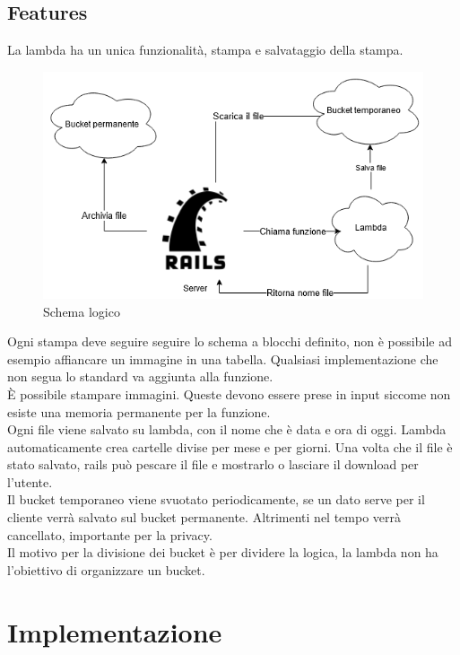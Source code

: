\documentclass[12pt]{article}
\begin{document}
\subsection{Features}
La lambda ha un unica funzionalità, stampa e salvataggio della stampa.
\begin{figure}[H]
\includegraphics[scale = 0.6]{useCases.png}
\caption{Schema logico}
\end{figure}
Ogni stampa deve seguire seguire lo schema a blocchi definito, non è possibile 
ad esempio affiancare un immagine in una tabella. 
Qualsiasi implementazione che non segua lo standard va aggiunta alla funzione.
\\ È possibile stampare immagini. Queste devono essere prese in input siccome non 
esiste una memoria permanente per la funzione.
\\ Ogni file viene salvato su lambda, con il nome che è data e ora di oggi. 
Lambda automaticamente crea cartelle divise per mese e per giorni. 
Una volta che il file è stato salvato, rails può pescare il file e mostrarlo 
o lasciare il download per l'utente.
\\ Il bucket temporaneo viene svuotato periodicamente, se un dato serve per il 
cliente verrà salvato sul bucket permanente. 
Altrimenti nel tempo verrà cancellato, importante per la privacy.
\\ Il motivo per la divisione dei bucket è per dividere la logica, 
la lambda non ha l'obiettivo di organizzare un bucket.



\section{Implementazione}
\end{document}
